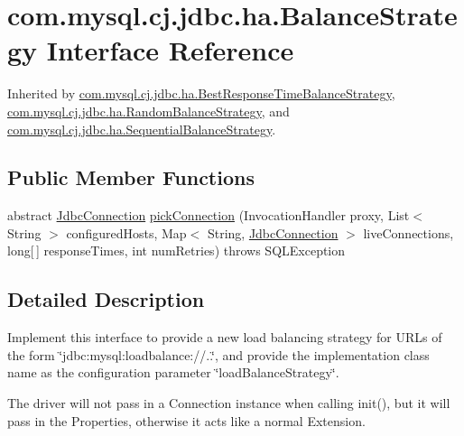 \hypertarget{interfacecom_1_1mysql_1_1cj_1_1jdbc_1_1ha_1_1_balance_strategy}{}\section{com.\+mysql.\+cj.\+jdbc.\+ha.\+Balance\+Strategy Interface Reference}
\label{interfacecom_1_1mysql_1_1cj_1_1jdbc_1_1ha_1_1_balance_strategy}


Inherited by \mbox{\hyperlink{classcom_1_1mysql_1_1cj_1_1jdbc_1_1ha_1_1_best_response_time_balance_strategy}{com.\+mysql.\+cj.\+jdbc.\+ha.\+Best\+Response\+Time\+Balance\+Strategy}}, \mbox{\hyperlink{classcom_1_1mysql_1_1cj_1_1jdbc_1_1ha_1_1_random_balance_strategy}{com.\+mysql.\+cj.\+jdbc.\+ha.\+Random\+Balance\+Strategy}}, and \mbox{\hyperlink{classcom_1_1mysql_1_1cj_1_1jdbc_1_1ha_1_1_sequential_balance_strategy}{com.\+mysql.\+cj.\+jdbc.\+ha.\+Sequential\+Balance\+Strategy}}.

\subsection*{Public Member Functions}
\begin{DoxyCompactItemize}
\item 
abstract \mbox{\hyperlink{interfacecom_1_1mysql_1_1cj_1_1jdbc_1_1_jdbc_connection}{Jdbc\+Connection}} \mbox{\hyperlink{interfacecom_1_1mysql_1_1cj_1_1jdbc_1_1ha_1_1_balance_strategy_a754b8e7a4e4baad812f650b3222cfbd5}{pick\+Connection}} (Invocation\+Handler proxy, List$<$ String $>$ configured\+Hosts, Map$<$ String, \mbox{\hyperlink{interfacecom_1_1mysql_1_1cj_1_1jdbc_1_1_jdbc_connection}{Jdbc\+Connection}} $>$ live\+Connections, long\mbox{[}$\,$\mbox{]} response\+Times, int num\+Retries)  throws S\+Q\+L\+Exception
\end{DoxyCompactItemize}


\subsection{Detailed Description}
Implement this interface to provide a new load balancing strategy for U\+R\+Ls of the form \char`\"{}jdbc\+:mysql\+:loadbalance\+://..\char`\"{}, and provide the implementation class name as the configuration parameter \char`\"{}load\+Balance\+Strategy\char`\"{}.

The driver will not pass in a Connection instance when calling init(), but it will pass in the Properties, otherwise it acts like a normal Extension.

